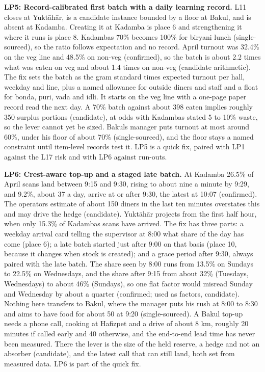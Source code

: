 \documentclass[
  10pt,
  table]{article}
\begin{document}
\textbf{LP5: Record-calibrated first batch with a daily learning record.} L11 closes at Yuktāhār, is a candidate instance bounded by a floor at Bakul, and is absent at Kadamba. Creating it at Kadamba is place 6 and strengthening it where it runs is place 8. Kadamba\textquotesingle s 70\% becomes 100\% for biryani lunch (single-sourced), so the ratio follows expectation and no record. April turnout was 32.4\% on the veg line and 48.5\% on non-veg (confirmed), so the batch is about 2.2 times what was eaten on veg and about 1.4 times on non-veg (candidate arithmetic). The fix sets the batch as the gram standard times expected turnout per hall, weekday and line, plus a named allowance for outside diners and staff and a float for bonda, puri, vada and idli. It starts on the veg line with a one-page paper record read the next day. A 70\% batch against about 398 eaten implies roughly 350 surplus portions (candidate), at odds with Kadamba\textquotesingle s stated 5 to 10\% waste, so the lever cannot yet be sized. Bakul\textquotesingle s manager puts turnout at most around 60\%, under his floor of about 70\% (single-sourced), and the floor stays a named constraint until item-level records test it. LP5 is a quick fix, paired with LP1 against the L17 risk and with LP6 against run-outs.

\textbf{LP6: Crest-aware top-up and a staged late batch.} At Kadamba 26.5\% of April scans land between 9:15 and 9:30, rising to about nine a minute by 9:29, and 9.2\%, about 37 a day, arrive at or after 9:30, the latest at 10:07 (confirmed). The operator\textquotesingle s estimate of about 150 diners in the last ten minutes overstates this and may drive the hedge (candidate). Yuktāhār projects from the first half hour, when only 15.3\% of Kadamba\textquotesingle s scans have arrived. The fix has three parts: a weekday arrival card telling the supervisor at 8:00 what share of the day has come (place 6); a late batch started just after 9:00 on that basis (place 10, because it changes when stock is created); and a grace period after 9:30, always paired with the late batch. The share seen by 8:00 runs from 13.5\% on Sundays to 22.5\% on Wednesdays, and the share after 9:15 from about 32\% (Tuesdays, Wednesdays) to about 46\% (Sundays), so one flat factor would misread Sunday and Wednesday by about a quarter (confirmed; used as factors, candidate). Nothing here transfers to Bakul, where the manager puts his rush at 8:00 to 8:30 and aims to have food for about 50 at 9:20 (single-sourced). A Bakul top-up needs a phone call, cooking at Hafizpet and a drive of about 8 km, roughly 20 minutes if called early and 40 otherwise, and the end-to-end lead time has never been measured. There the lever is the size of the held reserve, a hedge and not an absorber (candidate), and the latest call that can still land, both set from measured data. LP6 is part of the quick fix.
\end{document}

